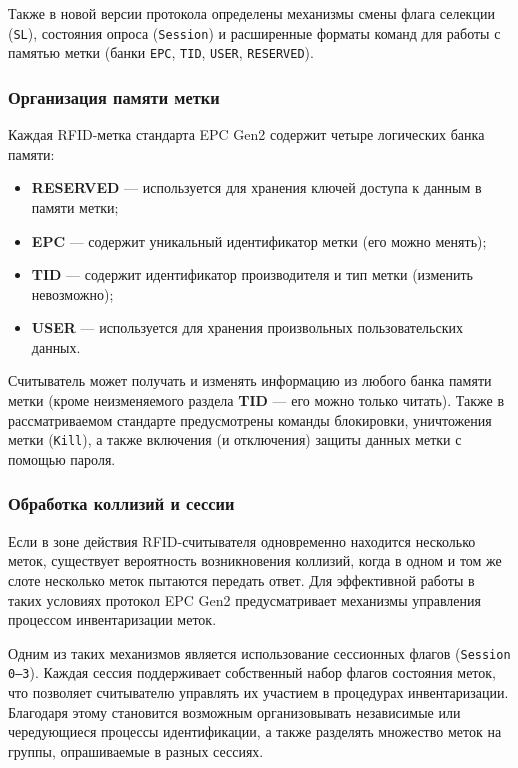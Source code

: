 \documentclass[12pt]{article}
\theoremstyle{definition}
\begin{document}
Также в новой версии протокола определены механизмы смены флага селекции (\texttt{SL}), состояния опроса (\texttt{Session}) и расширенные форматы команд для работы с памятью метки (банки \texttt{EPC}, \texttt{TID}, \texttt{USER}, \texttt{RESERVED}).

\subsubsection{Организация памяти метки}

Каждая RFID-метка стандарта EPC Gen2 содержит четыре логических банка памяти:

\begin{itemize}
  \item \textbf{RESERVED} --- используется для хранения ключей доступа к данным в памяти метки;
  \item \textbf{EPC} --- содержит уникальный идентификатор метки (его можно менять);
  \item \textbf{TID} --- содержит идентификатор производителя и тип метки (изменить невозможно);
  \item \textbf{USER} --- используется для хранения произвольных пользовательских данных.
\end{itemize}

Считыватель может получать и изменять информацию из любого банка памяти метки (кроме неизменяемого раздела \textbf{TID} --- его можно только читать). Также в рассматриваемом стандарте предусмотрены команды блокировки, уничтожения метки (\texttt{Kill}), а также включения (и отключения) защиты данных метки с помощью пароля.

\subsubsection{Обработка коллизий и сессии}

Если в зоне действия RFID-считывателя одновременно находится несколько меток, существует вероятность возникновения коллизий, когда в одном и том же слоте несколько меток пытаются передать ответ. Для эффективной работы в таких условиях протокол EPC Gen2 предусматривает механизмы управления процессом инвентаризации меток.

Одним из таких механизмов является использование сессионных флагов (\texttt{Session 0–3}). Каждая сессия поддерживает собственный набор флагов состояния меток, что позволяет считывателю управлять их участием в процедурах инвентаризации. Благодаря этому становится возможным организовывать независимые или чередующиеся процессы идентификации, а также разделять множество меток на группы, опрашиваемые в разных сессиях.
\end{document}
